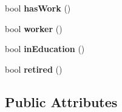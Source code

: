 \begin{DoxyCompactItemize}
\mbox{\label{classagent_a5d5e7089351107f21f00c73e342feb59}} 
bool {\bfseries has\+Work} ()
\item 
\mbox{\label{classagent_abcfbb2865a7cb599df7a6c5cbff2ce05}} 
bool {\bfseries worker} ()
\item 
\mbox{\label{classagent_a310065019aaf11c07c094c9cc5660471}} 
bool {\bfseries in\+Education} ()
\item 
\mbox{\label{classagent_a77eba7e6139ff396a166deee1f508f61}} 
bool {\bfseries retired} ()
\end{DoxyCompactItemize}
\subsection*{Public Attributes}
